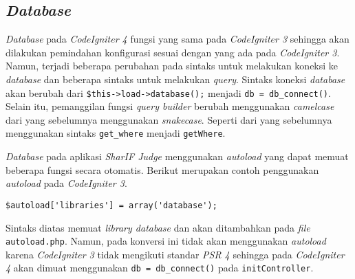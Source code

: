 \subsection{\textit{Database}}
\textit{Database} pada \textit{CodeIgniter 4} fungsi yang sama pada \textit{CodeIgniter 3} sehingga akan dilakukan pemindahan konfigurasi sesuai dengan yang ada pada \textit{CodeIgniter 3}. Namun, terjadi beberapa perubahan pada sintaks untuk melakukan koneksi ke \textit{database} dan beberapa sintaks untuk melakukan \textit{query}. Sintaks koneksi \textit{database} akan berubah dari \texttt{\$this->load->database();} menjadi \texttt{db = db\_connect()}. Selain itu, pemanggilan fungsi \textit{query builder} berubah menggunakan \textit{camelcase} dari yang sebelumnya menggunakan \textit{snakecase}. Seperti dari yang sebelumnya menggunakan sintaks \texttt{get\_where} menjadi \texttt{getWhere}.

\textit{Database} pada aplikasi \textit{SharIF Judge} menggunakan \textit{autoload} yang dapat memuat beberapa fungsi secara otomatis. Berikut merupakan contoh penggunakan \textit{autoload} pada \textit{CodeIgniter 3}.
\begin{center}
\verb|$autoload['libraries'] = array('database');|
\end{center}
Sintaks diatas memuat \textit{library database} dan akan  ditambahkan pada \textit{file} \texttt{autoload.php}. Namun, pada konversi ini tidak akan menggunakan \textit{autoload} karena \textit{CodeIgniter 3} tidak mengikuti standar \textit{PSR 4} sehingga pada \textit{CodeIgniter 4} akan dimuat menggunakan \texttt{db = db\_connect()} pada \texttt{initController}.

